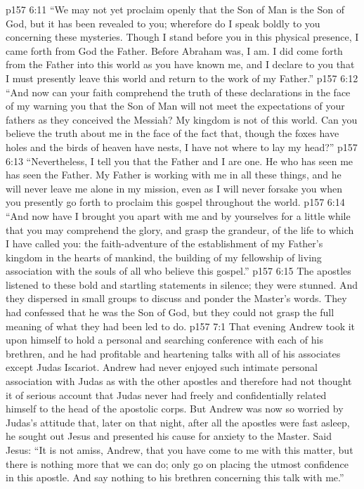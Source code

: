 \pc \vs p157 6:11 \textcolor{ubdarkred}{“We may not yet proclaim openly that the Son of Man is the Son of God, but it has been revealed to you; wherefore do I speak boldly to you concerning these mysteries. Though I stand before you in this physical presence, I came forth from God the Father. Before Abraham was, I am. I did come forth from the Father into this world as you have known me, and I declare to you that I must presently leave this world and return to the work of my Father.”}
\pc \vs p157 6:12 \textcolor{ubdarkred}{“And now can your faith comprehend the truth of these declarations in the face of my warning you that the Son of Man will not meet the expectations of your fathers as they conceived the Messiah? My kingdom is not of this world. Can you believe the truth about me in the face of the fact that, though the foxes have holes and the birds of heaven have nests, I have not where to lay my head?”}
\pc \vs p157 6:13 \textcolor{ubdarkred}{“Nevertheless, I tell you that the Father and I are one. He who has seen me has seen the Father. My Father is working with me in all these things, and he will never leave me alone in my mission, even as I will never forsake you when you presently go forth to proclaim this gospel throughout the world.}
\vs p157 6:14 \textcolor{ubdarkred}{“And now have I brought you apart with me and by yourselves for a little while that you may comprehend the glory, and grasp the grandeur, of the life to which I have called you: the faith\hyp{}adventure of the establishment of my Father’s kingdom in the hearts of mankind, the building of my fellowship of living association with the souls of all who believe this gospel.”}
\pc \vs p157 6:15 The apostles listened to these bold and startling statements in silence; they were stunned. And they dispersed in small groups to discuss and ponder the Master’s words. They had confessed that he was the Son of God, but they could not grasp the full meaning of what they had been led to do.
\vs p157 7:1 That evening Andrew took it upon himself to hold a personal and searching conference with each of his brethren, and he had profitable and heartening talks with all of his associates except Judas Iscariot. Andrew had never enjoyed such intimate personal association with Judas as with the other apostles and therefore had not thought it of serious account that Judas never had freely and confidentially related himself to the head of the apostolic corps. But Andrew was now so worried by Judas’s attitude that, later on that night, after all the apostles were fast asleep, he sought out Jesus and presented his cause for anxiety to the Master. Said Jesus: \textcolor{ubdarkred}{“It is not amiss, Andrew, that you have come to me with this matter, but there is nothing more that we can do; only go on placing the utmost confidence in this apostle. And say nothing to his brethren concerning this talk with me.”}
